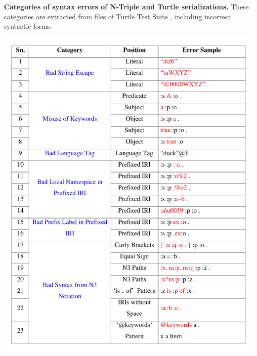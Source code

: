 \begin{appendices}
 \begin{table}[H]
 	\caption{\textbf{Categories of syntax errors of N-Triple and Turtle serializations.} These categories are extracted from files of Turtle Test Suite \cite{TurtleTests:Online}, including   incorrect syntactic forms.}
 \label{tab:syntaxErrorCate}
 	\centering
\includegraphics[width=5.5in]{images/bigTable.pdf}
\end{table}


\end{appendices}

